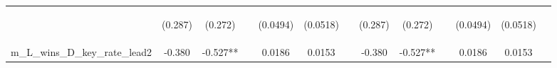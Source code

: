 \documentclass[]{article}
\begin{document}
\begin{center}
\begin{tabular}{lcccccccccccc}
\vspace{4pt} & \begin{footnotesize}(0.287)\end{footnotesize} & \begin{footnotesize}(0.272)\end{footnotesize} & \begin{footnotesize}\end{footnotesize} & \begin{footnotesize}(0.0494)\end{footnotesize} & \begin{footnotesize}(0.0518)\end{footnotesize} & \begin{footnotesize}\end{footnotesize} & \begin{footnotesize}(0.287)\end{footnotesize} & \begin{footnotesize}(0.272)\end{footnotesize} & \begin{footnotesize}\end{footnotesize} & \begin{footnotesize}(0.0494)\end{footnotesize} & \begin{footnotesize}(0.0518)\end{footnotesize} & \begin{footnotesize}\end{footnotesize} \\
m\_L\_wins\_D\_key\_rate\_lead2 & -0.380 & -0.527** &  & 0.0186 & 0.0153 &  & -0.380 & -0.527** &  & 0.0186 & 0.0153 &  \\

\end{tabular}
\end{center}
\end{document}
